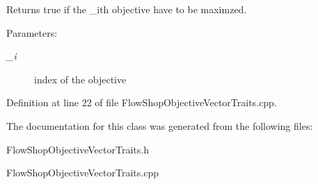 Returns true if the \_\-ith objective have to be maximzed. 

\begin{Desc}
\item[Parameters:]
\begin{description}
\item[{\em \_\-i}]index of the objective \end{description}
\end{Desc}


Definition at line 22 of file Flow\-Shop\-Objective\-Vector\-Traits.cpp.

The documentation for this class was generated from the following files:\begin{CompactItemize}
\item 
Flow\-Shop\-Objective\-Vector\-Traits.h\item 
Flow\-Shop\-Objective\-Vector\-Traits.cpp\end{CompactItemize}
